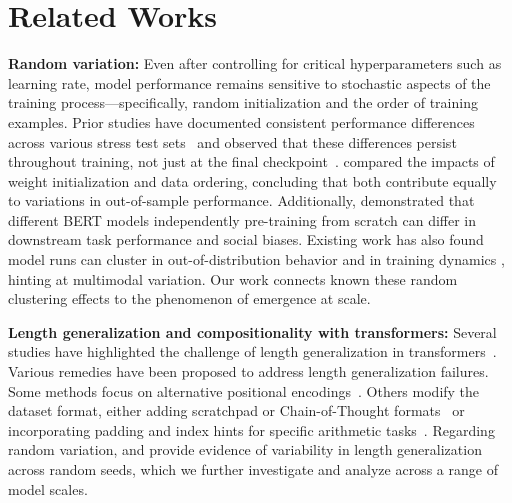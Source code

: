 \section{Related Works}
\textbf{Random variation:} Even after controlling for critical hyperparameters such as learning rate, model performance remains sensitive to stochastic aspects of the training process---specifically, random initialization and the order of training examples. Prior studies have documented consistent performance differences across various stress test sets~\citep{d2022underspecification, naik2018stress} and observed that these differences persist throughout training, not just at the final checkpoint~\citep{zhou2020curse}. \citet{dodge2020fine} compared the impacts of weight initialization and data ordering, concluding that both contribute equally to variations in out-of-sample performance. 
Additionally, \citet{sellammultiberts} demonstrated that different BERT models independently pre-training  from scratch can differ in downstream task performance and social biases. Existing work has also found model runs can cluster in out-of-distribution behavior \citep{juneja_linear_2023} and in training dynamics \citep{qin2024itree,hu_latent_2023}, hinting at multimodal variation. Our work connects known these random clustering effects to the phenomenon of emergence at scale.

\textbf{Length generalization and compositionality with transformers:} Several studies have highlighted the challenge of length generalization in transformers~\citep{anil2022exploring, deletangneural, gontier2020measuring, hupkes2020compositionality, schwarzschild2021can, zhang2022unveiling}. Various remedies have been proposed to address length generalization failures. Some methods focus on alternative positional encodings~\citep{shaw2018self, presstrain, su2024roformer, kazemnejad2024impact, jelassirepeat}. Others modify the dataset format, either adding scratchpad or Chain-of-Thought formats~\citep{anil2022exploring} or incorporating padding and index hints for specific arithmetic tasks~\citep{jelassi2023length, zhoualgorithms}. Regarding random variation, \citet{zhoualgorithms} and \citet{zhou2024transformers} provide evidence of variability in length generalization across random seeds, which we further investigate and analyze across a range of model scales.

